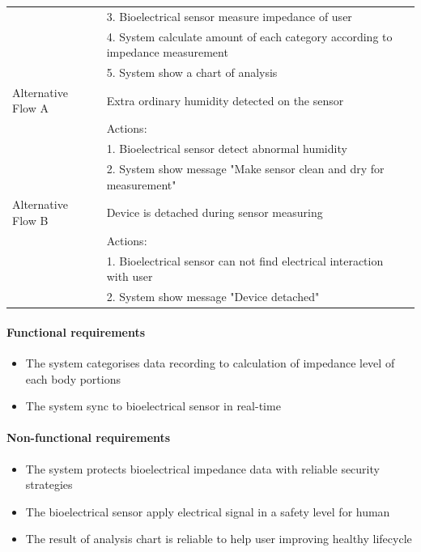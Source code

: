\documentclass{article}
\begin{document}
\begin{table}[htbp]
\begin{tabularx}{\textwidth}{|>{\raggedright\arraybackslash}p{}|X|}
								 & 3. Bioelectrical sensor measure impedance of user \\
								 & 4. System calculate amount of each category according to impedance measurement \\
								 & 5. System show a chart of analysis \\ \hline
				Alternative Flow A & Extra ordinary humidity detected on the sensor \\
								 & Actions: \\
								 & 1. Bioelectrical sensor detect abnormal humidity \\
								 & 2. System show message "Make sensor clean and dry for measurement" \\ \hline
				Alternative Flow B & Device is detached during sensor measuring \\
								 & Actions: \\
								 & 1. Bioelectrical sensor can not find electrical interaction with user  \\
								 & 2. System show message "Device detached" \\ \hline
			\end{tabularx}
		\end{table}
		\paragraph{Functional requirements}
		\begin{itemize}
			\item The system categorises data recording to calculation of impedance level of each body portions
			\item The system sync to bioelectrical sensor in real-time
		\end{itemize}
		
		\paragraph{Non-functional requirements}
		\begin{itemize}
			\item The system protects bioelectrical impedance data with reliable security strategies
			\item The bioelectrical sensor apply electrical signal in a safety level for human
			\item The result of analysis chart is reliable to help user improving healthy lifecycle
		\end{itemize}
		\newpage
		
\end{document}
